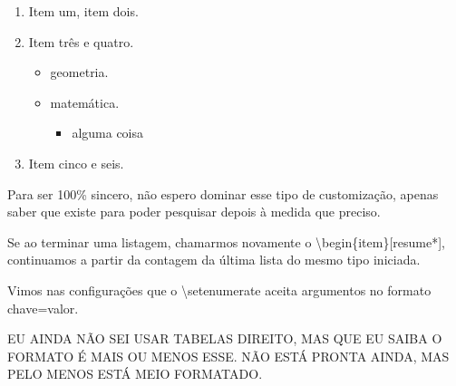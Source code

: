 
\begin{enumerate}
\item Item um, item dois.
\item Item três e quatro.
\begin{itemize}
\item geometria.
\item matemática.
	\begin{itemize}
		\item alguma coisa
	\end{itemize}
\end{itemize}
\item Item cinco e seis.
\end{enumerate}

Para ser 100\% sincero, não espero dominar esse tipo de customização, apenas
saber que existe para poder pesquisar depois à medida que preciso.

Se ao terminar uma listagem, chamarmos novamente o \textbackslash begin\{item\}[resume*], continuamos a partir da contagem da última lista do mesmo tipo iniciada.

Vimos nas configurações que o \textbackslash setenumerate aceita argumentos no formato chave=valor. 

EU AINDA NÃO SEI USAR TABELAS DIREITO, MAS QUE EU SAIBA O FORMATO É MAIS OU MENOS ESSE.
NÃO ESTÁ PRONTA AINDA, MAS PELO MENOS ESTÁ MEIO FORMATADO.


